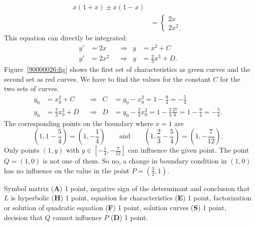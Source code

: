 \begin{loesung}
\begin{teilaufgaben}
\begin{align*}
x(1+x) \pm x(1-x)
\\
&=
\begin{cases}
2x  \\
2x^2.
\end{cases}
\end{align*}
This equation can directly be integrated:
\begin{align*}
y'&=2x   &&\Rightarrow& y&=x^2 + C \\
y'&=2x^2 &&\Rightarrow& y&=\frac23 x^3 + D.
\end{align*}
Figure~\ref{90000026:fig} shows the first set of characteristics
as green curves and the second set as red curves.
We have to find the values for the constant $C$ for the two sets of
curves.
\begin{align*}
	y_0 &= x_0^2 + C         &&\Rightarrow& C &= y_0 - x_0^2 = 1-\frac{9}{4} = -\frac{5}{4}\\
	y_0 &= \frac23 x_0^3 + D &&\Rightarrow& D &= y_0 -\frac23x_0^3 = 1 - \frac{2}{3}\frac{27}{8} = 1-\frac{9}{4} = -\frac{5}{4}.
\end{align*}
The corresponding points on the boundary where $x=1$ are
\[
(1,1-{\textstyle\frac54})
=
(1,-\textstyle{\frac14})
\qquad\text{and}\qquad
(1,{\textstyle\frac23}-{\textstyle\frac54})
=(1,-{\textstyle\frac{7}{12}}).
\]
Only points $(1,y)$ with $y\in[ -\frac{1}{4}, -\frac{7}{12} ]$ can
influence the given point.
The point $Q=(1,0)$ is not one of them.
So no, a change in boundary condition in $(1,0)$ has no influence on
the value in the point $P=(\frac32,1)$.
\qedhere
\end{teilaufgaben}
\end{loesung}

\begin{bewertung}
Symbol matrix ({\bf A}) 1 point,
negative sign of the determinant and conclusion that $L$ is hyperbolic
({\bf H}) 1 point,
equation for characteristics ({\bf E}) 1 point,
factorization or solution of quadratic equation ({\bf F}) 1 point,
solution curves ({\bf S}) 1 point,
decision that $Q$ cannot influence $P$ ({\bf D}) 1 point.
\end{bewertung}

